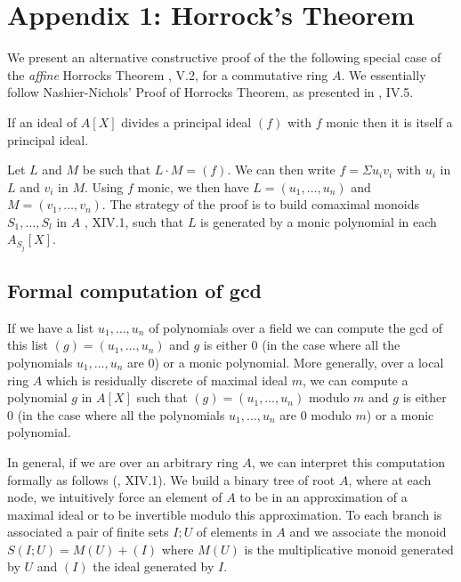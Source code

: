 \section*{Appendix 1: Horrock's Theorem}

We present an alternative constructive proof of the the following special case of the {\em affine}
Horrocks Theorem \cite{Lam}, V.2, for a commutative ring $A$. We
essentially follow Nashier-Nichols' Proof of Horrocks Theorem, as presented in \cite{Lam}, IV.5.

\begin{lemma}\label{Horrocks}
  If an ideal of $A[X]$ divides a principal ideal $(f)$ with $f$ monic then it is itself a principal ideal.
\end{lemma}

Let $L$ and $M$ be such that $L\cdot M = (f)$. We can then write $f = \Sigma u_iv_i$ with $u_i$ in $L$ and
$v_i$ in $M$. Using $f$ monic, we then have $L = (u_1,\dots,u_n)$ and $M = (v_1,\dots,v_n)$.
The strategy of the proof is to build comaximal monoids $S_1,\dots,S_l$ in $A$ \cite{lombardi-quitte},
XIV.1, such that $L$ is generated by a monic polynomial in each $A_{S_j}[X]$.

\subsection{Formal computation of gcd}


 If we have a list $u_1,\dots,u_n$ of polynomials over a field we can compute the gcd of this list
$(g) = (u_1,\dots,u_n)$ and $g$ is either $0$ (in the case where all the polynomials $u_1,\dots,u_n$ are $0$)
 or a monic polynomial. More generally, over a local ring $A$ which is residually discrete of maximal
 ideal $m$, we can compute a polynomial $g$ in $A[X]$ such that 
 $(g) = (u_1,\dots,u_n)$ modulo $m$
 and $g$ is either $0$ (in the case where all the polynomials $u_1,\dots,u_n$ are $0$ modulo $m$)
 or a monic polynomial.

In general, if we are over an arbitrary ring $A$, we can interpret this computation formally as
follows (\cite{lombardi-quitte}, XIV.1). We build a binary tree of root $A$, where at each node,
we intuitively force an element of $A$ to be in an approximation of a maximal ideal
or to be invertible modulo this approximation.
To each branch is associated a pair of finite sets $I;U$
of elements in $A$ and we associate the monoid $S(I;U) = M(U) + (I)$ where $M(U)$ is the multiplicative
monoid generated by $U$ and $(I)$ the ideal generated by $I$.

